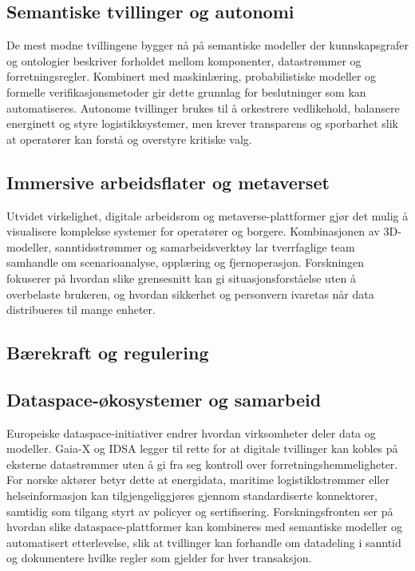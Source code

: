 \subsection{Semantiske tvillinger og autonomi}
De mest modne tvillingene bygger nå på semantiske modeller der kunnskapsgrafer og ontologier beskriver forholdet mellom komponenter, datastrømmer og forretningsregler. Kombinert med maskinlæring, probabilistiske modeller og formelle verifikasjonsmetoder gir dette grunnlag for beslutninger som kan automatiseres. Autonome tvillinger brukes til å orkestrere vedlikehold, balansere energinett og styre logistikksystemer, men krever transparens og sporbarhet slik at operatører kan forstå og overstyre kritiske valg.

\subsection{Immersive arbeidsflater og metaverset}
Utvidet virkelighet, digitale arbeidsrom og metaverse-plattformer gjør det mulig å visualisere komplekse systemer for operatører og borgere. Kombinasjonen av 3D-modeller, sanntidsstrømmer og samarbeidsverktøy lar tverrfaglige team samhandle om scenarioanalyse, opplæring og fjernoperasjon. Forskningen fokuserer på hvordan slike grensesnitt kan gi situasjonsforståelse uten å overbelaste brukeren, og hvordan sikkerhet og personvern ivaretas når data distribueres til mange enheter.

\subsection{Bærekraft og regulering}
\subsection{Dataspace-økosystemer og samarbeid}
Europeiske dataspace-initiativer endrer hvordan virksomheter deler data og modeller. Gaia-X og IDSA legger til rette for at digitale tvillinger kan kobles på eksterne datastrømmer uten å gi fra seg kontroll over forretningshemmeligheter.\citep{gaiax2022architecture} For norske aktører betyr dette at energidata, maritime logistikkstrømmer eller helseinformasjon kan tilgjengeliggjøres gjennom standardiserte konnektorer, samtidig som tilgang styrt av policyer og sertifisering. Forskningsfronten ser på hvordan slike dataspace-plattformer kan kombineres med semantiske modeller og automatisert etterlevelse, slik at tvillinger kan forhandle om datadeling i sanntid og dokumentere hvilke regler som gjelder for hver transaksjon.

